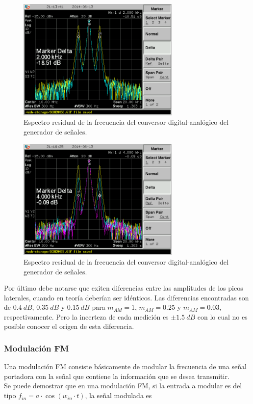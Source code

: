 \documentclass[a4paper,10pt]{article}
\begin{document}
		\begin{figure}[!htb]
				\centering
				\includegraphics[width=8cm]
				{Imagenes/SCREN457.png}
				\caption{Espectro residual de la frecuencia del conversor 
				digital-anal\'ogico del generador de se\~nales.}
				\label{AM2} 
		\end{figure}
		\begin{figure}[!htb]
				\centering
				\includegraphics[width=8cm]
				{Imagenes/SCREN458.png}
				\caption{Espectro residual de la frecuencia del conversor 
				digital-anal\'ogico del generador de se\~nales.}
				\label{AM3} 
		\end{figure}
		
		\indent Por \'ultimo debe notarse que exiten diferencias entre las 
		amplitudes de los picos laterales, cuando en teor\'ia deber\'ian ser 
		id\'enticos. Las diferencias encontradas son de $0.4~dB$, $0.35~dB$ y 
		$0.15~dB$ para $m_{AM}=1$, $m_{AM}=0.25$ y $m_{AM}=0.03$, 
		respectivamente. Pero la incerteza de cada medici\'on es $\pm1.5~dB$ con
		lo cual no es posible conocer el origen de esta diferencia.

		\subsubsection{Modulaci\'on FM}
		\indent Una modulaci\'on FM consiste b\'asicamente de modular la 
		frecuencia de una se\~nal portadora con la se\~nal que contiene la 
		informaci\'on que se desea transmitir. \\ 
		\indent Se puede demostrar que en una modulaci\'on FM, si la entrada a 
		modular es del tipo $f_{in}=a\cdot \cos(w_{in}\cdot t)$, la se\~nal 
		modulada es 
		
\end{document}
